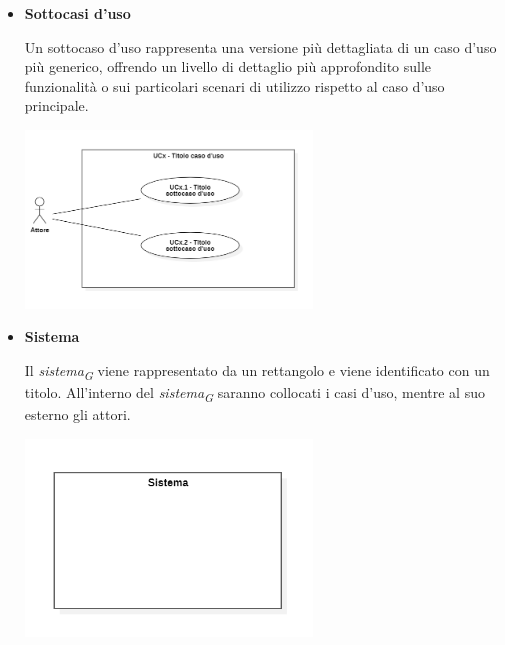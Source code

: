 \begin{itemize}
    \item \textbf{Sottocasi d'uso}
    
    Un sottocaso d'uso rappresenta una versione più dettagliata di un caso d'uso più generico, offrendo un livello di dettaglio più approfondito sulle funzionalità o sui particolari scenari di utilizzo rispetto al caso d'uso principale.

    \vspace{0.2cm}
    
    \begin{minipage}[H]{\linewidth}
        \centering
        \includegraphics[width=0.6\textwidth]{../Images/NormeDiProgetto/SottocasoD'Uso.PNG}
    \end{minipage}

    \vspace{0.4cm}

    \item \textbf{Sistema}
    
    Il \textit{sistema}\textsubscript{\textit{G}} viene rappresentato da un rettangolo e viene identificato con un titolo. All'interno del \textit{sistema}\textsubscript{\textit{G}} saranno collocati i casi d'uso, mentre al suo esterno gli attori.
    \begin{minipage}[H]{\linewidth}
        \centering
        \includegraphics[width=0.6\textwidth]{../Images/NormeDiProgetto/Sistema.PNG}
    \end{minipage}
    \pagebreak


\end{itemize}
